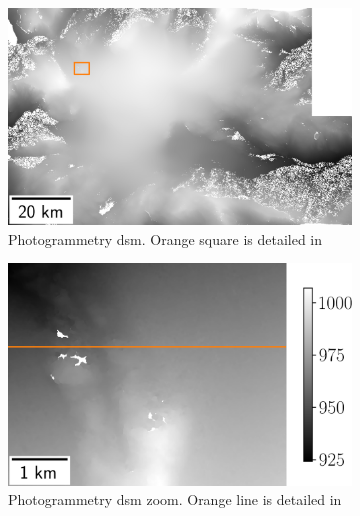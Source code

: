 \begin{figure}
    \begin{subfigure}[t]{0.3\linewidth}
        \flushleft
        \includegraphics[width=\linewidth]{Images/Chap_6/Langfjordjokelen_dsm_full_1850-2250_2250-2750.png}
        \caption{Photogrammetry \acrshort{dsm}. Orange square is detailed in }
        \label{fig:langfjordjokelen_dsm_full}
    \end{subfigure}\hfill
    \begin{subfigure}[t]{0.3\linewidth}
        \centering
        \includegraphics[width=\linewidth]{Images/Chap_6/Langfjordjokelen_dsm_zoom_1850-2250_2250-2750.png}
        \caption{Photogrammetry \acrshort{dsm} zoom. Orange line is detailed in }
        \label{fig:langfjordjokelen_dsm_zoom}
    \end{subfigure}\hfill
    \begin{subfigure}[t]{0.3\linewidth}

\end{subfigure}
\end{figure}
